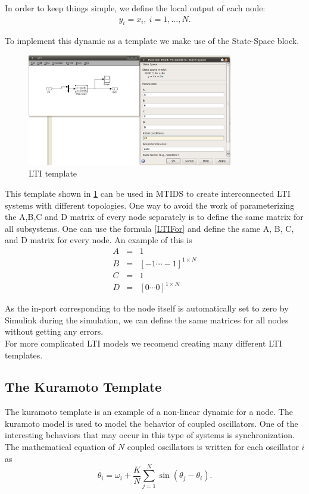 \documentclass[a4paper,twoside, openright,12pt]{report}
\begin{document}
In order to keep things simple, we define the local output of each node:
\begin{eqnarray}
 y_i=  x_i,\ i=1,\ldots,N. 
\end{eqnarray}

To implement this dynamic as a template we make use of the State-Space block.

\begin{figure}[htb]
\centering
\includegraphics[width=0.8\textwidth]{pics/screenLTI.eps}
\caption[MTIDS LTI Template]{LTI template}
\label{templateLTIFig}
\end{figure}
 
This template shown in \ref{templateLTIFig} can be used in MTIDS to create interconnected LTI systems with different topologies. One way to avoid 
the work of parameterizing the A,B,C and D matrix of every node separately is to define the same matrix for all subsystems. One can use the formula 
\ref{LTIFor} and define the same A, B, C, and D matrix for every node. An example of this is
\begin{eqnarray}
 A&=& 1\nonumber\\
B&=&[-1 \cdots -1]^{1\times N}\nonumber\\
C&=& 1\nonumber\\
D&=& [0 \cdots 0] ^{1\times N}\nonumber
\end{eqnarray}

As the in-port corresponding to the node itself is automatically set to zero by Simulink during the simulation, we can define the same matrices for all 
nodes without getting any errors.
\\

For more complicated LTI models we recomend creating many different LTI templates.

\subsection{The Kuramoto Template}
The kuramoto template is an example of a non-linear dynamic for a node. The kuramoto model is used to model the behavior of coupled oscillators. One of the interesting behaviors
that may occur in this type of systems is synchronization. The mathematical equation of $N$ coupled oscillators is written for each oscillator $i$ as
\begin{equation}\label{kuramotoFor}
 \dot{\theta_i} = \omega_i + \frac{K}{N} \sum_{j=1}^N \sin(\theta_j-\theta_i). 
\end{equation}
\end{document}
